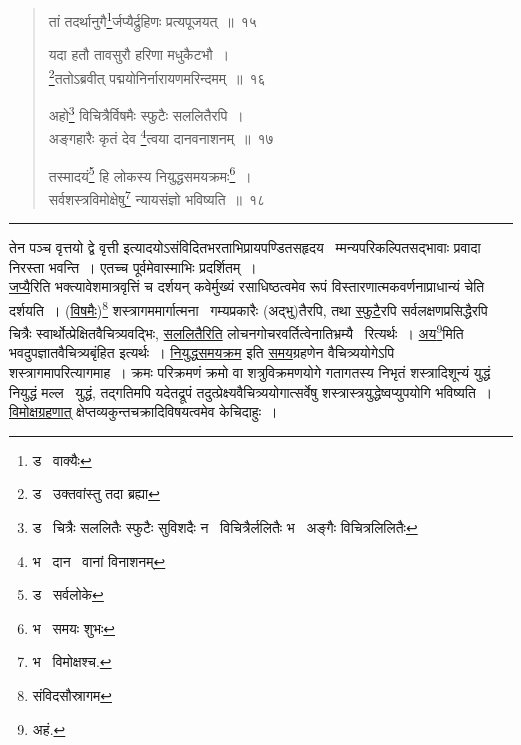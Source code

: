 \documentclass[11pt, openany]{book}
\begin{document}
\newpage

\begin{quote}
{\na तां तदर्थानुगै\renewcommand{\thefootnote}{1}\footnote{ड \textendash\ वाक्यैः}र्जप्यैर्द्रुहिणः प्रत्यपूजयत्~॥~१५

यदा हतौ तावसुरौ हरिणा मधुकैटभौ~।\\
\renewcommand{\thefootnote}{2}\footnote{ड \textendash\ उक्तवांस्तु तदा ब्रह्या}ततोऽब्रवीत् पद्मयोनिर्नारायणमरिन्दमम्~॥~१६

अहो\renewcommand{\thefootnote}{3}\footnote{ड \textendash\ चित्रैः सललितैः स्फुटैः सुविशदैः न \textendash\ विचित्रैर्ललितैः भ \textendash\ अङ्गैः विचित्रलिलितैः} विचित्रैर्विषमैः स्फुटैः सललितैरपि~।\\
अङ्गहारैः कृतं देव \renewcommand{\thefootnote}{4}\footnote{भ \textendash\ दान \textendash\ वानां विनाशनम्}त्वया दानवनाशनम्~॥~१७

तस्मादयं\renewcommand{\thefootnote}{5}\footnote{ड \textendash\ सर्वलोके} हि लोकस्य नियुद्धसमयक्रमः\renewcommand{\thefootnote}{6}\footnote{भ \textendash\ समयः शुभः}~।\\
सर्वशस्त्रविमोक्षेषु\renewcommand{\thefootnote}{7}\footnote{भ \textendash\ विमोक्षश्च.} न्यायसंज्ञो भविष्यति~॥~१८}
\end{quote}

\hrule

\vspace{2mm}
\noindent
तेन पञ्च वृत्तयो द्वे वृत्ती इत्यादयोऽसंविदितभरताभिप्रायपण्डितसहृदय \textendash\ म्मन्यपरिकल्पितसद्भावाः प्रवादा निरस्ता भवन्ति~। एतच्च पूर्वमेवास्माभिः प्रदर्शितम्~।\\

\underline{जप्यै}रिति भक्त्यावेशमात्रवृत्तिं च दर्शयन् कवेर्मुख्यं रसाधिष्ठत्वमेव रूपं विस्तारणात्मकवर्णनाप्राधान्यं चेति दर्शयति~। (\underline{विषमैः})\renewcommand{\thefootnote}{1}\footnote{संविदसौस्रागम} शस्त्रागममार्गात्मना \textendash\ गम्यप्रकारैः (अद्भु)तैरपि, तथा \underline{स्फुटै}रपि सर्वलक्षणप्रसिद्धैरपि चित्रैः स्वार्थोत्प्रेक्षितवैचित्र्यवद्भिः, \underline{सललितैरिति} लोचनगोचरवर्तित्वेनातिभ्रम्यै \textendash\ रित्यर्थः~। \underline{अय}\renewcommand{\thefootnote}{2}\footnote{अहं.}मिति भवदुपज्ञातवैचित्र्यबृंहित इत्यर्थः~। \underline{नियुद्धसमयक्रम} इति \underline{सम॒य}ग्रहणेन वैचित्र्ययोगेऽपि शस्त्रागमापरित्यागमाह~। क्रमः परिक्रमणं क्रमो वा शत्रुविक्रमणयोगे गतागतस्य निभृतं शस्त्रादिशून्यं युद्धं नियुद्धं मल्ल \textendash\ युद्धं, तद्गतिमपि यदेतद्रूपं तदुत्प्रेक्ष्यवैचित्र्ययोगात्सर्वेषु शस्त्रास्त्रयुद्धेष्वप्युपयोगि भविष्यति~। \underline{विमोक्षग्रहणात्} क्षेप्तव्यकुन्तचक्रादिविषयत्वमेव केचिदाहुः~।
\end{document}
